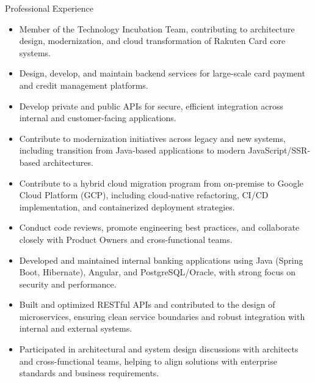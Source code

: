 \documentclass{resume}
\begin{document}

\begin{experienceSection}{Professional Experience}

\experienceItem[
company={Rakuten},
location={Fukuoka, Japan},
position={Application Engineer},
duration={Dec 2025 – Present}
]
\begin{itemize}
\itemsep -6pt {}
\item Member of the Technology Incubation Team, contributing to architecture design, modernization, and cloud transformation of Rakuten Card core systems.
\item Design, develop, and maintain backend services for large-scale card payment and credit management platforms.
\item Develop private and public APIs for secure, efficient integration across internal and customer-facing applications.
\item Contribute to modernization initiatives across legacy and new systems, including transition from Java-based applications to modern JavaScript/SSR-based architectures.
\item Contribute to a hybrid cloud migration program from on-premise to Google Cloud Platform (GCP), including cloud-native refactoring, CI/CD implementation, and containerized deployment strategies.
\item Conduct code reviews, promote engineering best practices, and collaborate closely with Product Owners and cross-functional teams.
\end{itemize}

\experienceItem[
company={Sogeti (on mission at BGL BNP Paribas)},
location={Luxembourg},
position={Software Engineer},
duration={Feb 2025 – Nov 2025}
]
\begin{itemize}
\itemsep -6pt {}
\item Developed and maintained internal banking applications using Java (Spring Boot, Hibernate), Angular, and PostgreSQL/Oracle, with strong focus on security and performance.
\item Built and optimized RESTful APIs and contributed to the design of microservices, ensuring clean service boundaries and robust integration with internal and external systems.
\item Participated in architectural and system design discussions with architects and cross-functional teams, helping to align solutions with enterprise standards and business requirements.
\end{itemize}


\end{experienceSection}
\end{document}
